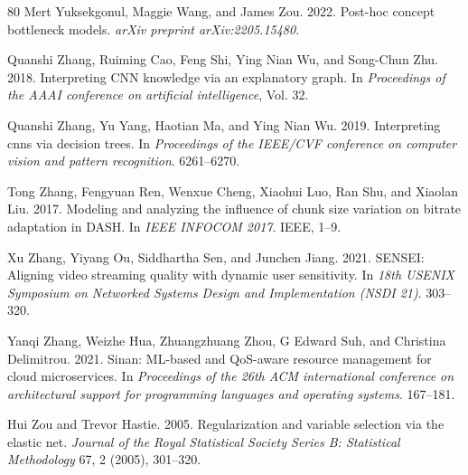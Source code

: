 \documentclass[11pt,a4paper]{article}
\begin{document}
\begin{thebibliography}{80}
 Mert Yuksekgonul, Maggie Wang, and James Zou. 2022. Post-hoc concept bottleneck models. \emph{arXiv preprint arXiv:2205.15480}.

 Quanshi Zhang, Ruiming Cao, Feng Shi, Ying Nian Wu, and Song-Chun Zhu. 2018. Interpreting CNN knowledge via an explanatory graph. In \emph{Proceedings of the AAAI conference on artificial intelligence}, Vol. 32.

 Quanshi Zhang, Yu Yang, Haotian Ma, and Ying Nian Wu. 2019. Interpreting cnns via decision trees. In \emph{Proceedings of the IEEE/CVF conference on computer vision and pattern recognition}. 6261--6270.

 Tong Zhang, Fengyuan Ren, Wenxue Cheng, Xiaohui Luo, Ran Shu, and Xiaolan Liu. 2017. Modeling and analyzing the influence of chunk size variation on bitrate adaptation in DASH. In \emph{IEEE INFOCOM 2017}. IEEE, 1--9.

 Xu Zhang, Yiyang Ou, Siddhartha Sen, and Junchen Jiang. 2021. SENSEI: Aligning video streaming quality with dynamic user sensitivity. In \emph{18th USENIX Symposium on Networked Systems Design and Implementation (NSDI 21)}. 303--320.

 Yanqi Zhang, Weizhe Hua, Zhuangzhuang Zhou, G Edward Suh, and Christina Delimitrou. 2021. Sinan: ML-based and QoS-aware resource management for cloud microservices. In \emph{Proceedings of the 26th ACM international conference on architectural support for programming languages and operating systems}. 167--181.

 Hui Zou and Trevor Hastie. 2005. Regularization and variable selection via the elastic net. \emph{Journal of the Royal Statistical Society Series B: Statistical Methodology} 67, 2 (2005), 301--320.

\end{thebibliography}
\end{document}
